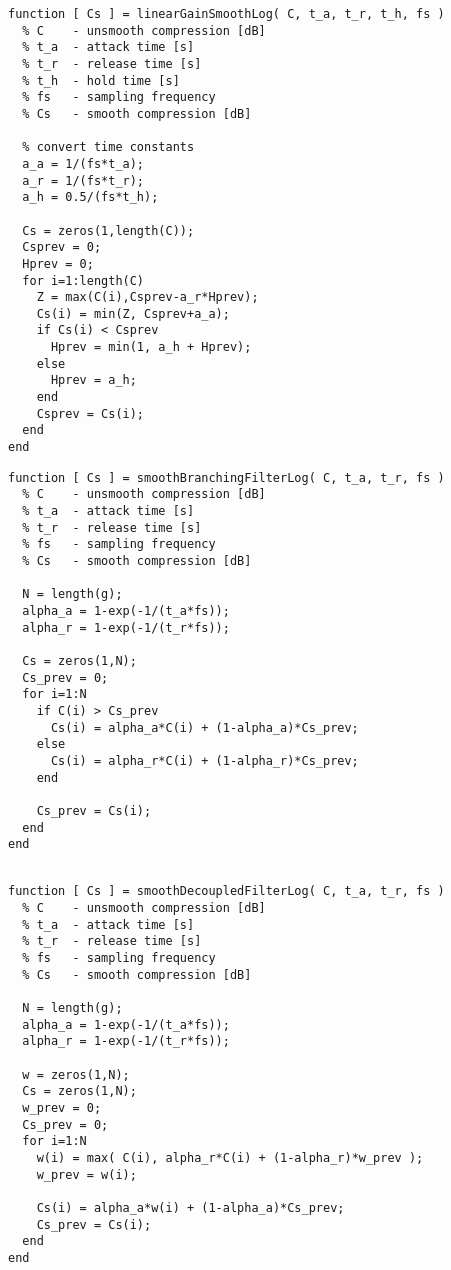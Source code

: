 \documentclass[../main2.tex]{subfiles}
\begin{document}

\begin{lstlisting}[style=customc]
function [ Cs ] = linearGainSmoothLog( C, t_a, t_r, t_h, fs )
  % C    - unsmooth compression [dB]
  % t_a  - attack time [s]
  % t_r  - release time [s]
  % t_h  - hold time [s]
  % fs   - sampling frequency
  % Cs   - smooth compression [dB]

  % convert time constants
  a_a = 1/(fs*t_a);
  a_r = 1/(fs*t_r);
  a_h = 0.5/(fs*t_h);
    
  Cs = zeros(1,length(C));
  Csprev = 0;
  Hprev = 0;
  for i=1:length(C)
    Z = max(C(i),Csprev-a_r*Hprev);
    Cs(i) = min(Z, Csprev+a_a); 
    if Cs(i) < Csprev
      Hprev = min(1, a_h + Hprev);
    else 
      Hprev = a_h;
    end
    Csprev = Cs(i);
  end
end
\end{lstlisting}


\begin{lstlisting}[style=customc]
function [ Cs ] = smoothBranchingFilterLog( C, t_a, t_r, fs )
  % C    - unsmooth compression [dB]
  % t_a  - attack time [s]
  % t_r  - release time [s]
  % fs   - sampling frequency
  % Cs   - smooth compression [dB]

  N = length(g);
  alpha_a = 1-exp(-1/(t_a*fs));
  alpha_r = 1-exp(-1/(t_r*fs));
    
  Cs = zeros(1,N);
  Cs_prev = 0;
  for i=1:N
    if C(i) > Cs_prev
      Cs(i) = alpha_a*C(i) + (1-alpha_a)*Cs_prev;
    else
      Cs(i) = alpha_r*C(i) + (1-alpha_r)*Cs_prev;
    end
    
    Cs_prev = Cs(i);
  end
end
\end{lstlisting}

\begin{lstlisting}[style=customc]

function [ Cs ] = smoothDecoupledFilterLog( C, t_a, t_r, fs )
  % C    - unsmooth compression [dB]
  % t_a  - attack time [s]
  % t_r  - release time [s]
  % fs   - sampling frequency 
  % Cs   - smooth compression [dB]

  N = length(g);
  alpha_a = 1-exp(-1/(t_a*fs));
  alpha_r = 1-exp(-1/(t_r*fs));
    
  w = zeros(1,N);
  Cs = zeros(1,N);
  w_prev = 0;
  Cs_prev = 0;
  for i=1:N
    w(i) = max( C(i), alpha_r*C(i) + (1-alpha_r)*w_prev );
    w_prev = w(i);
    
    Cs(i) = alpha_a*w(i) + (1-alpha_a)*Cs_prev;
    Cs_prev = Cs(i);
  end
end
\end{lstlisting}
\end{document}
